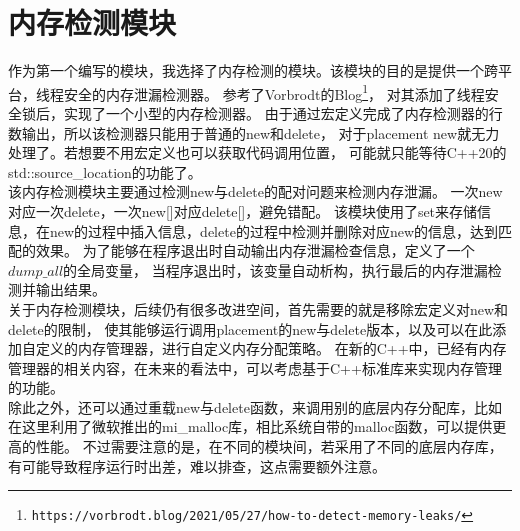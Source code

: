 \section{内存检测模块}

作为第一个编写的模块，我选择了内存检测的模块。该模块的目的是提供一个跨平台，线程安全的内存泄漏检测器。
参考了Vorbrodt的Blog\footnote{\nolinkurl{https://vorbrodt.blog/2021/05/27/how-to-detect-memory-leaks/}}，
对其添加了线程安全锁后，实现了一个小型的内存检测器。
由于通过宏定义完成了内存检测器的行数输出，所以该检测器只能用于普通的new和delete，
对于placement new就无力处理了。若想要不用宏定义也可以获取代码调用位置，
可能就只能等待C++20的std::source\_location的功能了。\\

该内存检测模块主要通过检测new与delete的配对问题来检测内存泄漏。
一次new对应一次delete，一次new[]对应delete[]，避免错配。
该模块使用了set来存储信息，在new的过程中插入信息，delete的过程中检测并删除对应new的信息，达到匹配的效果。
为了能够在程序退出时自动输出内存泄漏检查信息，定义了一个$dump\_all$的全局变量，
当程序退出时，该变量自动析构，执行最后的内存泄漏检测并输出结果。\\





关于内存检测模块，后续仍有很多改进空间，首先需要的就是移除宏定义对new和delete的限制，
使其能够运行调用placement的new与delete版本，以及可以在此添加自定义的内存管理器，进行自定义内存分配策略。
在新的C++中，已经有内存管理器的相关内容，在未来的看法中，可以考虑基于C++标准库来实现内存管理的功能。\\

除此之外，还可以通过重载new与delete函数，来调用别的底层内存分配库，比如在这里利用了微软推出的mi\_malloc库，相比系统自带的malloc函数，可以提供更高的性能。
不过需要注意的是，在不同的模块间，若采用了不同的底层内存库，有可能导致程序运行时出差，难以排查，这点需要额外注意。






